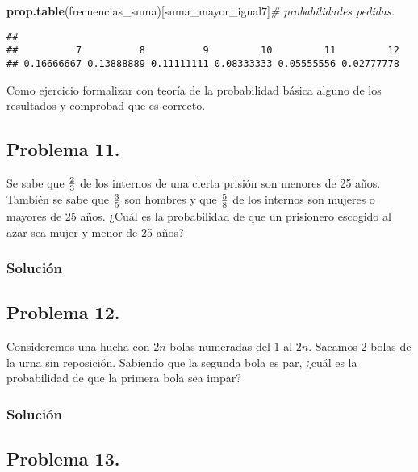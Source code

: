 \documentclass[
]{article}
\newenvironment{Shaded}{\begin{snugshade}}{\end{snugshade}}
\newcommand{\CommentTok}[1]{\textcolor[rgb]{0.56,0.35,0.01}{\textit{#1}}}
\newcommand{\KeywordTok}[1]{\textcolor[rgb]{0.13,0.29,0.53}{\textbf{#1}}}
\newcommand{\NormalTok}[1]{#1}
\begin{document}
\begin{Shaded}
\begin{Highlighting}[]
\KeywordTok{prop.table}\NormalTok{(frecuencias\_suma)[suma\_mayor\_igual7]}\CommentTok{\# probabilidades pedidas.}
\end{Highlighting}
\end{Shaded}

\begin{verbatim}
## 
##          7          8          9         10         11         12 
## 0.16666667 0.13888889 0.11111111 0.08333333 0.05555556 0.02777778
\end{verbatim}

Como ejercicio formalizar con teoría de la probabilidad básica alguno de
los resultados y comprobad que es correcto.

\hypertarget{problema-11.}{%
\subsection{Problema 11.}\label{problema-11.}}

Se sabe que \({2 \over 3}\) de los internos de una cierta prisión son
menores de 25 años. También se sabe que \({3\over 5}\) son hombres y que
\({5\over 8}\) de los internos son mujeres o mayores de 25 años. ¿Cuál
es la probabilidad de que un prisionero escogido al azar sea mujer y
menor de 25 años?

\hypertarget{soluciuxf3n-11}{%
\subsubsection{Solución}\label{soluciuxf3n-11}}

\hypertarget{problema-12.}{%
\subsection{Problema 12.}\label{problema-12.}}

Consideremos una hucha con \(2n\) bolas numeradas del \(1\) al \(2n\).
Sacamos \(2\) bolas de la urna sin reposición. Sabiendo que la segunda
bola es par, ¿cuál es la probabilidad de que la primera bola sea impar?

\hypertarget{soluciuxf3n-12}{%
\subsubsection{Solución}\label{soluciuxf3n-12}}

\hypertarget{problema-13.}{%
\subsection{Problema 13.}\label{problema-13.}}
\end{document}
